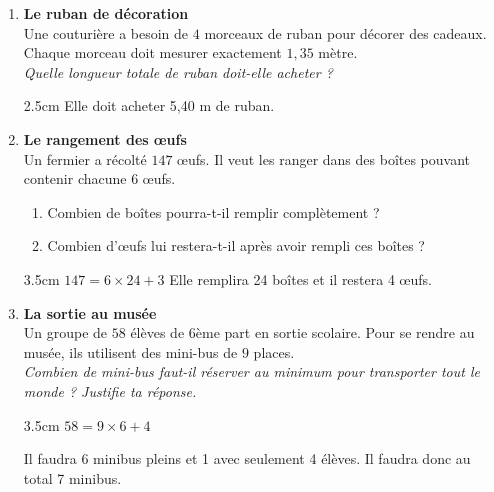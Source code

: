 \documentclass[a4paper]{book}
\begin{document}
{\begin{exercice}
\begin{enumerate}
            \begin{ZoneReponse}{2.5cm}
                 \hspace{2cm} Il doit ajouter 37,6 l d'essence dans sa voiture.
            \end{ZoneReponse}
            
        
            \item \textbf{Le ruban de décoration} \\
            Une couturière a besoin de $4$ morceaux de ruban pour décorer des cadeaux. Chaque morceau doit mesurer exactement $1,35$ mètre. \\
            \textit{Quelle longueur totale de ruban doit-elle acheter ?}

            \begin{ZoneReponse}{2.5cm}
                 \hspace{2cm} Elle doit acheter 5,40 m de ruban.
            \end{ZoneReponse}
            
        
            \item \textbf{Le rangement des œufs} \\
            Un fermier a récolté $147$ œufs. Il veut les ranger dans des boîtes pouvant contenir chacune $6$ œufs. 
            \begin{enumerate}
                \item Combien de boîtes pourra-t-il remplir complètement ? 
                \item Combien d'œufs lui restera-t-il après avoir rempli ces boîtes ?
            \end{enumerate}
        
            \begin{ZoneReponse}{3.5cm}
                 \hspace{1cm} $147=6\times24+3$ \hspace{2cm} Elle remplira 24 boîtes et il restera 4 œufs.
            \end{ZoneReponse}
            
        
            \item \textbf{La sortie au musée} \\
            Un groupe de $58$ élèves de 6ème part en sortie scolaire. Pour se rendre au musée, ils utilisent des mini-bus de $9$ places. \\
            \textit{Combien de mini-bus faut-il réserver au minimum pour transporter tout le monde ? Justifie ta réponse.}

            \begin{ZoneReponse}{3.5cm}
                 \hspace{1cm} $58=9\times6+4$ 

                \medskip
                
                Il faudra 6 minibus pleins et 1 avec seulement 4 élèves. Il faudra donc au total 7 minibus.
            \end{ZoneReponse}
        \end{enumerate}
    \end{exercice}
}
\end{document}

